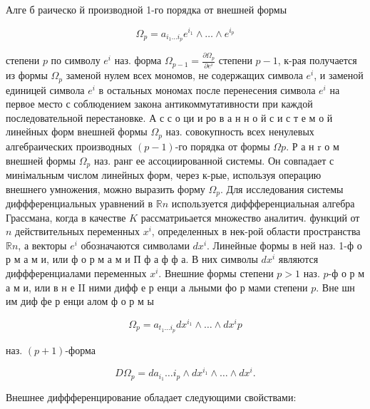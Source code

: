 \documentclass[10pt]{article}
\begin{document}
Алге б раическо й производной 1-го порядка от внешней формы



\[

\Omega_{p}=a_{i_{1} \ldots i_{p}} e^{i_{1}} \wedge \ldots \wedge e^{i_{p}}

\]



степени $p$ по символу $e^{i}$ наз. форма $\Omega_{p-1}=\frac{\partial \Omega_{p}}{\partial e^{i}}$ степени $p-1$, к-рая получается из формы $\Omega_{p}$ заменой нулем всех мономов, не содержащих символа $e^{i}$, и заменой единицей символа $e^{i}$ в остальных мономах после перенесения символа $e^{i}$ на первое место с соблюдением закона антикоммутативности при каждой последовательной перестановке. А с с о ци и ро в а н н о й с и с т е м о й линейных форм внешней формы $\Omega_{p}$ наз. совокупность всех ненулевых алгебраических производных $(p-1)$-го порядка от формы $\Omega p$. Р а н $\mathrm{r}$ о м внешней формы $\Omega_{p}$ наз. ранг ее ассоциированной системы. Он совпадает с минімальным числом линейных форм, через к-рые, используя операцию внешнего умножения, можно выразить форму $\Omega_{p}$. Для исследования системы диффференциальных уравнений в $\mathbb{R} n$ используется диффференциальная алгебра Грассмана, когда в качестве $K$ рассматриьается множество аналитич. функций от $n$ действительных переменных $x^{i}$, определенных в нек-рой области пространства $\mathbb{R} n$, а векторы $e^{i}$ обозначаются символами $d x^{i}$. Линейные формы в ней наз. 1-ф о р м а м и, или ф о р м а м и П ф а ф ф а. В них символы $d x^{i}$ являются диффференциалами переменных $x^{i}$. Внешние формы степени $p>1$ наз. $p$-ф о р м а м и, или в н е II ними дифф е р енци а льными фо р мами степени $p$. Вне шн им диф фе р енци алом ф о р м ы



\[

\Omega_{p}=a_{t_{1} \ldots i_{p}} d x^{i_{1}} \wedge \ldots \wedge d x^{i} p

\]



наз. $(p+1)$-форма



\[

D \Omega_{p}=d a_{i_{1}} \ldots i_{p} \wedge d x^{i_{1}} \wedge \ldots \wedge d x^{i} .

\]



Внешнее диффференцирование обладает следующими свойствами:
\end{document}
